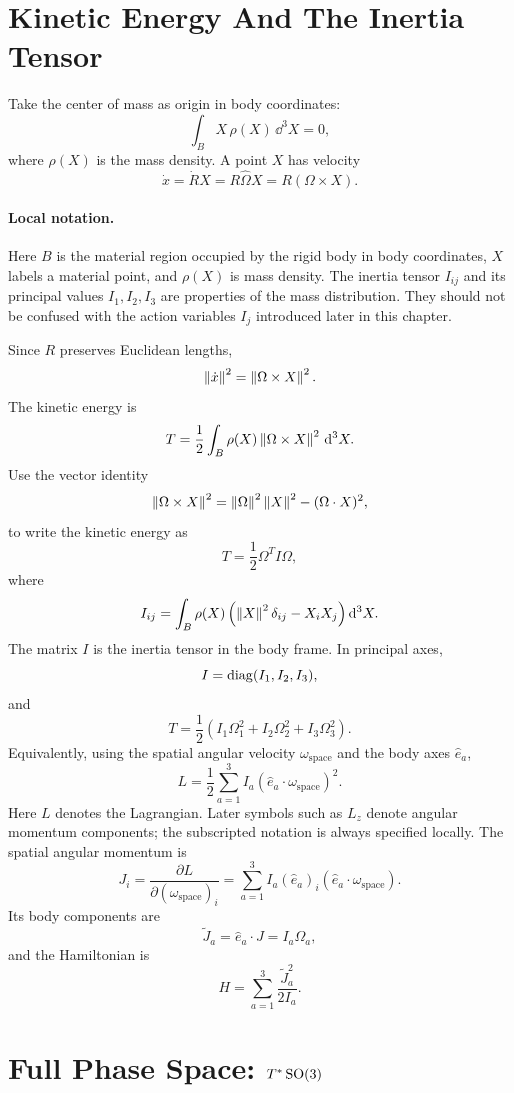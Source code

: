 \section{Kinetic Energy And The Inertia Tensor}
\label{sec:inertia-tensor}

Take the center of mass as origin in body coordinates:
\[
  \int_B X\,\rho(X)\,\dd^3X=0,
\]
where \(\rho(X)\) is the mass density. A point \(X\) has velocity
\[
  \dot x=\dot R X=R\widehat\Omega X=R(\Omega\times X).
\]

\paragraph{Local notation.}
Here \(B\) is the material region occupied by the rigid body in body
coordinates, \(X\) labels a material point, and \(\rho(X)\) is mass density.
The inertia tensor \(I_{ij}\) and its principal values \(I_1,I_2,I_3\) are
properties of the mass distribution.  They should not be confused with the
action variables \(I_j\) introduced later in this chapter.

Since \(R\) preserves Euclidean lengths,
\[
  \left\lVert \dot x\right\rVert^2=\left\lVert \Omega\times X\right\rVert^2.
\]
The kinetic energy is
\[
  T=\frac12\int_B\rho(X)\left\lVert \Omega\times X\right\rVert^2\,\mathrm{d}^3X.
\]
Use the vector identity
\[
  \left\lVert \Omega\times X\right\rVert^2
  =
  \left\lVert \Omega\right\rVert^2\left\lVert X\right\rVert^2-(\Omega\cdot X)^2,
\]
to write the kinetic energy as
\[
  T=\frac12\Omega^T I\Omega,
\]
where
\[
  I_{ij}
  =
  \int_B\rho(X)
  \left(\left\lVert X\right\rVert^2\delta_{ij}-X_iX_j\right)\mathrm{d}^3X.
\]
The matrix \(I\) is the inertia tensor in the body frame. In principal axes,
\[
  I=\operatorname{diag}(I_1,I_2,I_3),
\]
and
\[
  T=\frac12(I_1\Omega_1^2+I_2\Omega_2^2+I_3\Omega_3^2).
\]
Equivalently, using the spatial angular velocity \(\omega_{\mathrm{space}}\) and the body axes
\(\hat e_a\),
\[
  L=\frac12\sum_{a=1}^3 I_a(\hat e_a\cdot\omega_{\mathrm{space}})^2.
\]
Here \(L\) denotes the Lagrangian. Later symbols such as \(L_z\) denote angular
momentum components; the subscripted notation is always specified locally.
The spatial angular momentum is
\[
  J_i=\frac{\partial L}{\partial (\omega_{\mathrm{space}})_i}
  =
  \sum_{a=1}^3 I_a(\hat e_a)_i(\hat e_a\cdot\omega_{\mathrm{space}}).
\]
Its body components are
\[
  \widetilde J_a=\hat e_a\cdot J=I_a\Omega_a,
\]
and the Hamiltonian is
\[
  H=\sum_{a=1}^3\frac{\widetilde J_a^2}{2I_a}.
\]

\section{\texorpdfstring{Full Phase Space: \(T^*\operatorname{SO}(3)\)}{Full Phase Space: T*SO(3)}}
\label{sec:rigid-full-phase-space}


